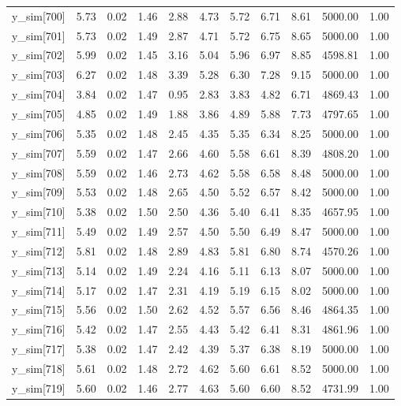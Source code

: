 \begin{table}[ht]
\begin{tabular}{rrrrrrrrrrr}
  y\_sim[700] & 5.73 & 0.02 & 1.46 & 2.88 & 4.73 & 5.72 & 6.71 & 8.61 & 5000.00 & 1.00 \\ 
  y\_sim[701] & 5.73 & 0.02 & 1.49 & 2.87 & 4.71 & 5.72 & 6.75 & 8.65 & 5000.00 & 1.00 \\ 
  y\_sim[702] & 5.99 & 0.02 & 1.45 & 3.16 & 5.04 & 5.96 & 6.97 & 8.85 & 4598.81 & 1.00 \\ 
  y\_sim[703] & 6.27 & 0.02 & 1.48 & 3.39 & 5.28 & 6.30 & 7.28 & 9.15 & 5000.00 & 1.00 \\ 
  y\_sim[704] & 3.84 & 0.02 & 1.47 & 0.95 & 2.83 & 3.83 & 4.82 & 6.71 & 4869.43 & 1.00 \\ 
  y\_sim[705] & 4.85 & 0.02 & 1.49 & 1.88 & 3.86 & 4.89 & 5.88 & 7.73 & 4797.65 & 1.00 \\ 
  y\_sim[706] & 5.35 & 0.02 & 1.48 & 2.45 & 4.35 & 5.35 & 6.34 & 8.25 & 5000.00 & 1.00 \\ 
  y\_sim[707] & 5.59 & 0.02 & 1.47 & 2.66 & 4.60 & 5.58 & 6.61 & 8.39 & 4808.20 & 1.00 \\ 
  y\_sim[708] & 5.59 & 0.02 & 1.46 & 2.73 & 4.62 & 5.58 & 6.58 & 8.48 & 5000.00 & 1.00 \\ 
  y\_sim[709] & 5.53 & 0.02 & 1.48 & 2.65 & 4.50 & 5.52 & 6.57 & 8.42 & 5000.00 & 1.00 \\ 
  y\_sim[710] & 5.38 & 0.02 & 1.50 & 2.50 & 4.36 & 5.40 & 6.41 & 8.35 & 4657.95 & 1.00 \\ 
  y\_sim[711] & 5.49 & 0.02 & 1.49 & 2.57 & 4.50 & 5.50 & 6.49 & 8.47 & 5000.00 & 1.00 \\ 
  y\_sim[712] & 5.81 & 0.02 & 1.48 & 2.89 & 4.83 & 5.81 & 6.80 & 8.74 & 4570.26 & 1.00 \\ 
  y\_sim[713] & 5.14 & 0.02 & 1.49 & 2.24 & 4.16 & 5.11 & 6.13 & 8.07 & 5000.00 & 1.00 \\ 
  y\_sim[714] & 5.17 & 0.02 & 1.47 & 2.31 & 4.19 & 5.19 & 6.15 & 8.02 & 5000.00 & 1.00 \\ 
  y\_sim[715] & 5.56 & 0.02 & 1.50 & 2.62 & 4.52 & 5.57 & 6.56 & 8.46 & 4864.35 & 1.00 \\ 
  y\_sim[716] & 5.42 & 0.02 & 1.47 & 2.55 & 4.43 & 5.42 & 6.41 & 8.31 & 4861.96 & 1.00 \\ 
  y\_sim[717] & 5.38 & 0.02 & 1.47 & 2.42 & 4.39 & 5.37 & 6.38 & 8.19 & 5000.00 & 1.00 \\ 
  y\_sim[718] & 5.61 & 0.02 & 1.48 & 2.72 & 4.62 & 5.60 & 6.61 & 8.52 & 5000.00 & 1.00 \\ 
  y\_sim[719] & 5.60 & 0.02 & 1.46 & 2.77 & 4.63 & 5.60 & 6.60 & 8.52 & 4731.99 & 1.00 \\ 

\end{tabular}
\end{table}

